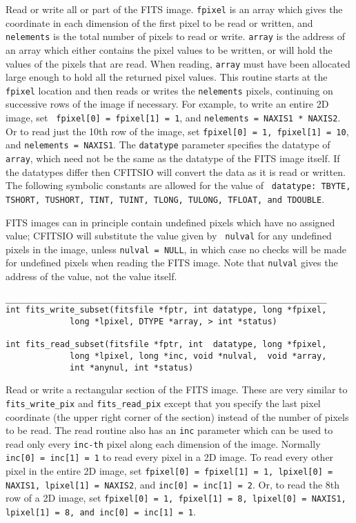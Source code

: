 \documentclass[11pt]{article}
\begin{document}
Read or write all or part of the FITS image.  {\tt fpixel} is an array
which gives the coordinate in each dimension of the first pixel to be
read or written, and {\tt nelements} is the total number of pixels to
read or write.  {\tt array} is the address of an array which either
contains the pixel values to be written, or will hold the values of the
pixels that are read.  When reading, {\tt array} must have been
allocated large enough to hold all the returned pixel values.  This
routine starts at the {\tt fpixel} location and then reads or writes
the {\tt nelements} pixels, continuing on successive rows of the image
if necessary.  For example, to write an entire 2D image, set {\tt
fpixel[0] = fpixel[1] = 1}, and {\tt nelements = NAXIS1 * NAXIS2}.  Or
to read just the 10th row of the image, set {\tt fpixel[0] = 1,
fpixel[1] = 10}, and {\tt nelements = NAXIS1}.  The {\tt datatype}
parameter specifies the datatype of {\tt array}, which need not be the
same as the datatype of the FITS image itself.  If the datatypes differ
then CFITSIO will convert the data as it is read or written.  The
following symbolic constants are allowed for the value of {\tt
datatype:  TBYTE, TSHORT, TUSHORT, TINT, TUINT, TLONG, TULONG, TFLOAT,
and TDOUBLE}.

FITS images can in principle contain undefined pixels which have no
assigned value;  CFITSIO will substitute the value given by {\tt
nulval}  for  any undefined pixels in the image, unless {\tt nulval =
NULL}, in which case no checks will be made for undefined pixels when
reading the FITS image. Note that {\tt nulval} gives the address of the
value, not the value itself.

\begin{verbatim}
_________________________________________________________________
int fits_write_subset(fitsfile *fptr, int datatype, long *fpixel,
             long *lpixel, DTYPE *array, > int *status)

int fits_read_subset(fitsfile *fptr, int  datatype, long *fpixel,
             long *lpixel, long *inc, void *nulval,  void *array,
             int *anynul, int *status)
\end{verbatim}

Read or write a rectangular section of the FITS image.  These are very
similar to {\tt fits\_write\_pix} and {\tt fits\_read\_pix} except that
you specify the last pixel coordinate (the upper right corner of the
section) instead of the number of pixels to be read.  The read routine
also has an {\tt inc} parameter which can be used to read only every
{\tt inc-th} pixel along each dimension of the image.  Normally  {\tt
inc[0] = inc[1] = 1} to read every pixel in a 2D image.  To read every
other pixel in the entire 2D image, set {\tt fpixel[0] = fpixel[1] = 1,
lpixel[0] = NAXIS1, lpixel[1] = NAXIS2}, and {\tt inc[0] = inc[1] =
2}.  Or, to read the 8th row of a 2D image, set {\tt fpixel[0] = 1,
fpixel[1] = 8, lpixel[0] = NAXIS1, lpixel[1] = 8, and inc[0] = inc[1] =
1}.
\end{document}

